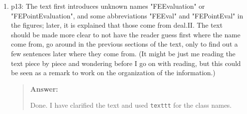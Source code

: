 \documentclass[11pt, a4paper]{article}
\newenvironment{answer}{%
      \begin{quote}%
            \color{blue!80!black}%
            \textbf{Answer:}%
            }{%
      \end{quote}%
}
\begin{document}
\begin{enumerate}[label=\textbullet, wide, labelindent=0pt]
\begin{answer}
                  However in this repo ghost penalty is not implemented.
                  FEEvaluation and  FEPointEvaluation are exactly the classes used in [3] so the comparison was already
                  done, just the description was inaccurate.

                  The micro-benchmarks in the paper are done in a way that emphasizes the number of floating point
                  operations and the memory accesses should not interfere.

                  The benchmarked code is the same. I just add ghost penalty on top of it.
            \end{answer}
      \item p13: The text first introduces unknown names "FEEvaluation" or "FEPointEvaluation", and some
            abbreviations "FEEval" and "FEPointEval" in the figures; later, it is explained that those come from
            deal.II.
            The text
            should be made more clear to not have the reader guess first where the name come from, go around in the
            previous
            sections of the text, only to find out a few sentences later where they come from. (It might be just me
            reading the
            text piece by piece and wondering before I go on with reading, but this could be seen as a remark to work
            on
            the
            organization of the information.)
            \begin{answer}
                  Done. I have clarified the text and used \texttt{texttt} for the class names.
            \end{answer}


\end{enumerate}
\end{document}
